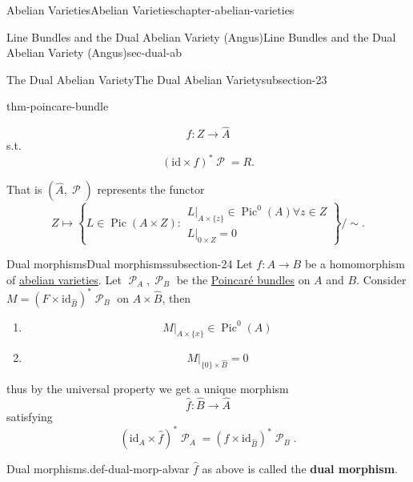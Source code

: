 \documentclass[oneside,10pt,]{book}
\newcommand{\terminology}[1]{\textbf{#1}}
\numberwithin{equation}{section}
\newcommand{\sheaf}[1]{\operatorname{\mathcal{#1}}}
\newcommand{\id}{\mathrm{id}}
\DeclareMathOperator{\Pic}{Pic}
\begin{document}
\begin{chapterptx}{Abelian Varieties}{}{Abelian Varieties}{}{}{chapter-abelian-varieties}
\begin{sectionptx}{Line Bundles and the Dual Abelian Variety (Angus)}{}{Line Bundles and the Dual Abelian Variety (Angus)}{}{}{sec-dual-ab}
\begin{subsectionptx}{The Dual Abelian Variety}{}{The Dual Abelian Variety}{}{}{subsection-23}
\begin{theorem}{}{}{thm-poincare-bundle}
\begin{enumerate}
\begin{equation*}
f\colon Z\to \hat A
\end{equation*}
s.t.%
\begin{equation*}
(\id\times f)^* \sheaf P = R\text{.}
\end{equation*}
%
\end{enumerate}
That is \((\hat A, \sheaf P)\)  represents the functor%
\begin{equation*}
Z \mapsto \left\{ L\in \Pic (A\times Z) : \substack{ L|_{A\times \{z\}} \in \Pic^0(A) \forall z\in Z \\L|_{ 0 \times Z } = 0}\right\}/\sim\text{.}
\end{equation*}
%
\end{theorem}
\end{subsectionptx}
%
%
\typeout{************************************************}
\typeout{************************************************}
%
\begin{subsectionptx}{Dual morphisms}{}{Dual morphisms}{}{}{subsection-24}
\hypertarget{p-195}{}%
Let \(f\colon A\to B\) be a homomorphism of \hyperref[def-buntes-abvar]{abelian varieties}. Let \(\sheaf P_A,\sheaf P_B\) be the \hyperref[thm-poincare-bundle]{Poincaré bundles} on  \(A\) and \(B\). Consider \(M=    (F\times \id_{\hat B})^* \sheaf P_B\) on \(A\times \hat B\), then\leavevmode%
\begin{enumerate}
\item\hypertarget{li-38}{}%
\begin{equation*}
M|_{A\times \{x\}} \in \Pic^0(A)
\end{equation*}
%
\item\hypertarget{li-39}{}%
\begin{equation*}
M|_{\{0\} \times \hat B} = 0
\end{equation*}
%
\end{enumerate}
thus by the universal property we get a unique morphism%
\begin{equation*}
\hat f\colon \hat B \to \hat A
\end{equation*}
satisfying%
\begin{equation*}
(\id_A\times \hat f)^* \sheaf P_A = (f\times \id_{\hat B})^*\sheaf P_B\text{.}
\end{equation*}
%
\begin{definition}{Dual morphisms.}{def-dual-morp-abvar}%
\hypertarget{p-196}{}%
\(\hat f\) as above is called the \terminology{dual morphism}.%
\end{definition}

\end{subsectionptx}
\end{sectionptx}
\end{chapterptx}
\end{document}
